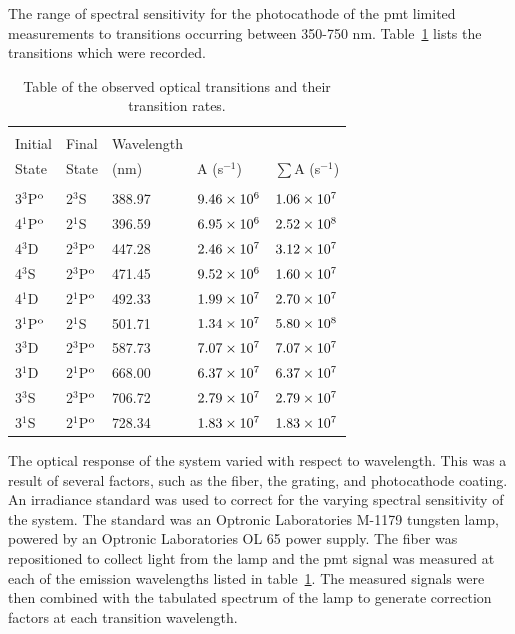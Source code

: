 The range of spectral sensitivity for the photocathode of the \acs{pmt} limited
measurements to transitions occurring between 350-750 nm.
Table~\ref{tbl:transitions} lists the transitions which were recorded.
\begin{table}
  \centering
  \caption{Table of the observed optical transitions and their transition
    rates.}
  \begin{tabular}{lllll}
    \toprule                                                                    \\
    Initial      & Final        & Wavelength &              &                   \\
    State        & State        & (nm)       & A (s$^{-1}$) & $\sum$A (s$^{-1}$)\\
    \midrule                                                                    \\
    3$^3$P$^\mathrm{o}$ & 2$^3$S       & 388.97     & $9.46\times10^6$   & $1.06\times10^7$        \\
    4$^1$P$^\mathrm{o}$ & 2$^1$S       & 396.59     & $6.95\times10^6$   & $2.52\times10^8$        \\
    4$^3$D       & 2$^3$P$^\mathrm{o}$ & 447.28     & $2.46\times10^7$   & $3.12\times10^7$        \\
    4$^3$S       & 2$^3$P$^\mathrm{o}$ & 471.45     & $9.52\times10^6$   & $1.60\times10^7$        \\
    4$^1$D       & 2$^1$P$^\mathrm{o}$ & 492.33     & $1.99\times10^7$   & $2.70\times10^7$        \\
    3$^1$P$^\mathrm{o}$ & 2$^1$S       & 501.71     & $1.34\times10^7$   & $5.80\times10^8$        \\
    3$^3$D       & 2$^3$P$^\mathrm{o}$ & 587.73     & $7.07\times10^7$   & $7.07\times10^7$        \\
    3$^1$D       & 2$^1$P$^\mathrm{o}$ & 668.00     & $6.37\times10^7$   & $6.37\times10^7$        \\
    3$^3$S       & 2$^3$P$^\mathrm{o}$ & 706.72     & $2.79\times10^7$   & $2.79\times10^7$        \\
    3$^1$S       & 2$^1$P$^\mathrm{o}$ & 728.34     & $1.83\times10^7$   & $1.83\times10^7$        \\
  \end{tabular}
  \label{tbl:transitions}
\end{table}
The optical response of the system varied with respect to wavelength. This was a
result of several factors, such as the fiber, the grating, and photocathode
coating. An irradiance standard was used to correct for the varying spectral
sensitivity of the system. The standard was an Optronic Laboratories M-1179
tungsten lamp, powered by an Optronic Laboratories OL 65 power supply. The fiber
was repositioned to collect light from the lamp and the \acs{pmt} signal was
measured at each of the emission wavelengths listed in
table~\ref{tbl:transitions}. The measured signals were then combined with the
tabulated spectrum of the lamp to generate correction factors at each transition
wavelength.

